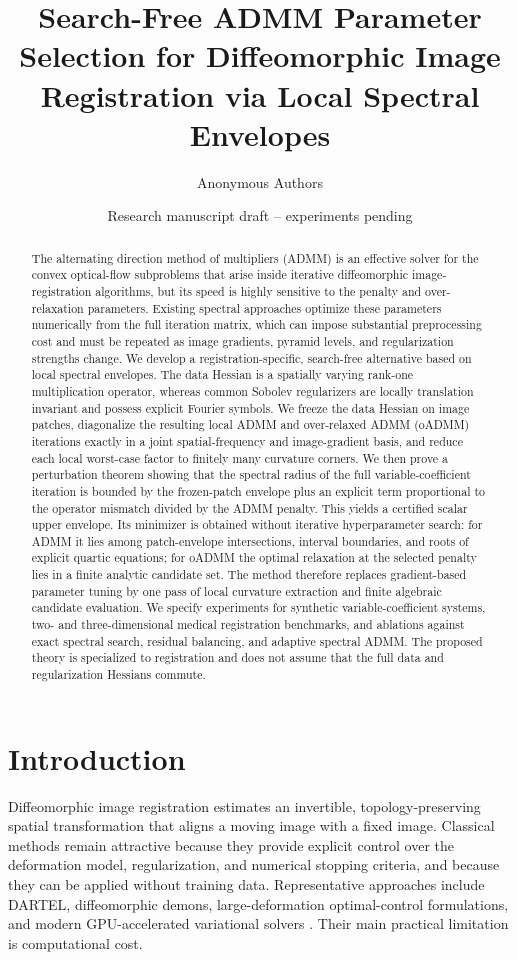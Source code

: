 \documentclass[11pt]{article}
\title{\textbf{Search-Free ADMM Parameter Selection for Diffeomorphic Image Registration via Local Spectral Envelopes}}
\author{Anonymous Authors}
\date{Research manuscript draft -- experiments pending}
\theoremstyle{definition}
\begin{document}
\maketitle

\begin{abstract}
The alternating direction method of multipliers (ADMM) is an effective solver for the convex optical-flow subproblems that arise inside iterative diffeomorphic image-registration algorithms, but its speed is highly sensitive to the penalty and over-relaxation parameters. Existing spectral approaches optimize these parameters numerically from the full iteration matrix, which can impose substantial preprocessing cost and must be repeated as image gradients, pyramid levels, and regularization strengths change. We develop a registration-specific, search-free alternative based on local spectral envelopes. The data Hessian is a spatially varying rank-one multiplication operator, whereas common Sobolev regularizers are locally translation invariant and possess explicit Fourier symbols. We freeze the data Hessian on image patches, diagonalize the resulting local ADMM and over-relaxed ADMM (oADMM) iterations exactly in a joint spatial-frequency and image-gradient basis, and reduce each local worst-case factor to finitely many curvature corners. We then prove a perturbation theorem showing that the spectral radius of the full variable-coefficient iteration is bounded by the frozen-patch envelope plus an explicit term proportional to the operator mismatch divided by the ADMM penalty. This yields a certified scalar upper envelope. Its minimizer is obtained without iterative hyperparameter search: for ADMM it lies among patch-envelope intersections, interval boundaries, and roots of explicit quartic equations; for oADMM the optimal relaxation at the selected penalty lies in a finite analytic candidate set. The method therefore replaces gradient-based parameter tuning by one pass of local curvature extraction and finite algebraic candidate evaluation. We specify experiments for synthetic variable-coefficient systems, two- and three-dimensional medical registration benchmarks, and ablations against exact spectral search, residual balancing, and adaptive spectral ADMM. The proposed theory is specialized to registration and does not assume that the full data and regularization Hessians commute.
\end{abstract}

\section{Introduction}
Diffeomorphic image registration estimates an invertible, topology-preserving spatial transformation that aligns a moving image with a fixed image. Classical methods remain attractive because they provide explicit control over the deformation model, regularization, and numerical stopping criteria, and because they can be applied without training data. Representative approaches include DARTEL, diffeomorphic demons, large-deformation optimal-control formulations, and modern GPU-accelerated variational solvers \cite{Ashburner2007,Vercauteren2009,MangBiros2015,Thorley2021}. Their main practical limitation is computational cost.
\end{document}
